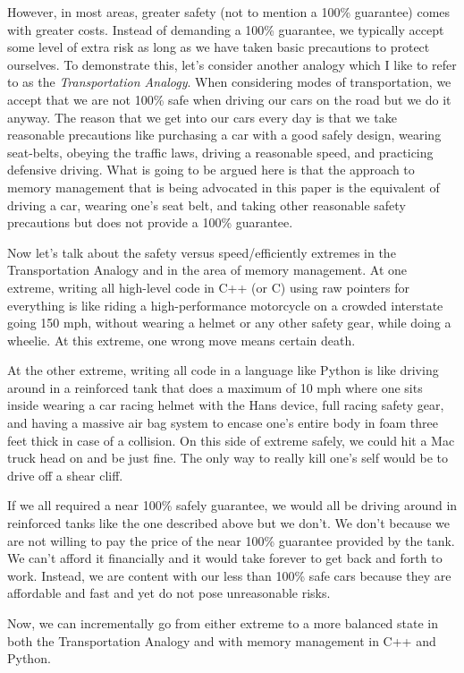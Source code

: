 \documentclass[pdf,ps2pdf,11pt]{SANDreport}
\begin{document}
However, in most areas, greater safety (not to mention a 100\%
guarantee) comes with greater costs.  Instead of demanding a 100\%
guarantee, we typically accept some level of extra risk as long as we
have taken basic precautions to protect ourselves.  To demonstrate
this, let's consider another analogy which I like to refer to as the
{}\textit{Transportation Analogy}.  When considering modes of
transportation, we accept that we are not 100\% safe when driving our
cars on the road but we do it anyway.  The reason that we get into our
cars every day is that we take reasonable precautions like purchasing
a car with a good safely design, wearing seat-belts, obeying the
traffic laws, driving a reasonable speed, and practicing defensive
driving.  What is going to be argued here is that the approach to
memory management that is being advocated in this paper is the
equivalent of driving a car, wearing one's seat belt, and taking other
reasonable safety precautions but does not provide a 100\% guarantee.

Now let's talk about the safety versus speed/efficiently extremes in
the Transportation Analogy and in the area of memory management.  At
one extreme, writing all high-level code in C++ (or C) using raw
pointers for everything is like riding a high-performance motorcycle
on a crowded interstate going 150 mph, without wearing a helmet or any
other safety gear, while doing a wheelie.  At this extreme, one wrong
move means certain death.

At the other extreme, writing all code in a language like Python is
like driving around in a reinforced tank that does a maximum of 10 mph
where one sits inside wearing a car racing helmet with the Hans
device, full racing safety gear, and having a massive air bag system
to encase one's entire body in foam three feet thick in case of a
collision.  On this side of extreme safely, we could hit a Mac truck
head on and be just fine.  The only way to really kill one's self
would be to drive off a shear cliff.

If we all required a near 100\% safely guarantee, we would all be
driving around in reinforced tanks like the one described above but we
don't.  We don't because we are not willing to pay the price of the
near 100\% guarantee provided by the tank.  We can't afford it
financially and it would take forever to get back and forth to
work. Instead, we are content with our less than 100\% safe cars
because they are affordable and fast and yet do not pose unreasonable
risks.

Now, we can incrementally go from either extreme to a more balanced
state in both the Transportation Analogy and with memory management in
C++ and Python.
\end{document}
